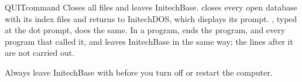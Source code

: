 \begin{XbaseEntry}{QUIT}{command}
Closes all files and leaves InitechBase.
\Syntax
{}
\Usage
{} closes every open database with its index files and returns to
InitechDOS, which displays its prompt.  , typed at the dot prompt,
does the same.  In a program,  ends the program, and every program
that called it, and leaves InitechBase in the same way; the lines after it are
not carried out.

Always leave InitechBase with  before you turn off or restart the
computer.
\Examples
{}
\end{XbaseEntry}

